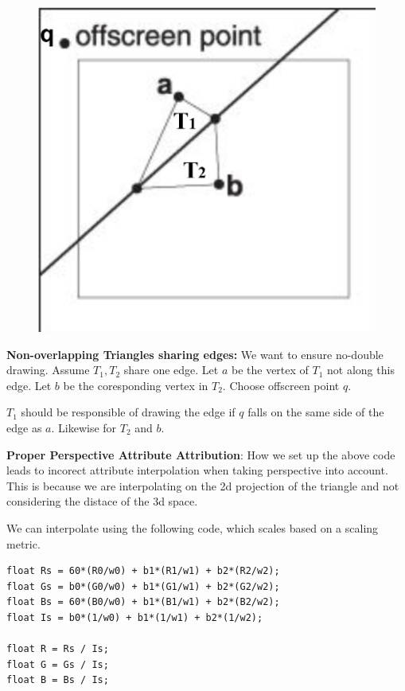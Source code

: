 \documentclass[letterpaper, 8pt]{extarticle}
\begin{document}
\begin{multicols*}{4}
\begin{figure}
    \includegraphics[width=\linewidth]{rasterize-triangle-edge.png}
\end{figure}
\textbf{Non-overlapping Triangles sharing edges:} We want to ensure no-double drawing. 
Assume $T_1, T_2$ share one edge. Let $a$ be the vertex of $T_1$ not along this edge. Let $b$ be the coresponding vertex in $T_2$.
Choose offscreen point $q$.

$T_1$ should be responsible of drawing the edge if $q$ falls on the same side of the edge as $a$. Likewise for $T_2$ and $b$.

\textbf{Proper Perspective Attribute Attribution}: How we set up the above code leads to incorect attribute interpolation when taking perspective into account.
This is because we are interpolating on the 2d projection of the triangle and not considering the distace of the 3d space.

We can interpolate using the following code, which scales based on a scaling metric.

\begin{lstlisting}
float Rs = 60*(R0/w0) + b1*(R1/w1) + b2*(R2/w2);
float Gs = b0*(G0/w0) + b1*(G1/w1) + b2*(G2/w2);
float Bs = 60*(B0/w0) + b1*(B1/w1) + b2*(B2/w2);
float Is = b0*(1/w0) + b1*(1/w1) + b2*(1/w2);

float R = Rs / Is;
float G = Gs / Is;
float B = Bs / Is;
\end{lstlisting}



\end{multicols*}
\end{document}
